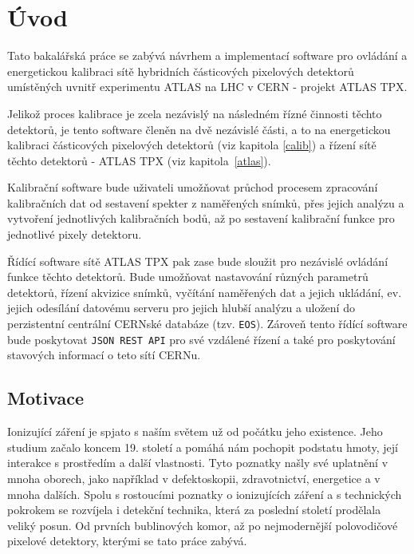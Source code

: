 

\chapter{Úvod}\label{chap01}
Tato bakalářská práce se zabývá návrhem a implementací software pro ovládání a energetickou kalibraci sítě hybridních částicových pixelových detektorů umístěných uvnitř experimentu ATLAS na LHC v CERN - projekt ATLAS TPX. 

Jelikož proces kalibrace je zcela nezávislý na následném řízné činnosti těchto detektorů, je tento software členěn na dvě nezávislé části, a to na energetickou kalibraci částicových pixelových detektorů (viz kapitola \ref{calib}) a řízení sítě těchto detektorů - ATLAS TPX (viz kapitola~\ref{atlas}).

Kalibrační software bude uživateli umožňovat průchod procesem zpracování kalibračních dat od sestavení spekter z naměřených snímků, přes jejich analýzu a vytvoření jednotlivých kalibračních bodů, až po sestavení kalibrační funkce pro jednotlivé pixely detektoru.

Řídící software sítě ATLAS TPX pak zase bude sloužit pro nezávislé ovládání funkce těchto detektorů. Bude umožňovat nastavování různých parametrů detektorů, řízení akvizice snímků, vyčítání naměřených dat a jejich ukládání, ev. jejich odesílání datovému serveru pro jejich hlubší analýzu a uložení do perzistentní centrální CERNské databáze (tzv. \texttt{EOS}). Zároveň tento řídící software bude poskytovat \texttt{JSON REST API} pro své vzdálené řízení a také pro poskytování stavových informací o teto sítí CERNu.

\section{Motivace}
Ionizující záření je spjato s naším světem už od počátku jeho existence. Jeho studium začalo koncem 19. století a pomáhá nám pochopit podstatu hmoty, její interakce s prostředím a další vlastnosti. Tyto poznatky našly své uplatnění v mnoha oborech, jako například v defektoskopii, zdravotnictví, energetice a v mnoha dalších. Spolu s rostoucími poznatky o ionizujících záření a s technických pokrokem se rozvíjela i detekční technika, která za poslední století prodělala veliký posun. Od prvních bublinových komor, až po nejmodernější polovodičové pixelové detektory, kterými se tato práce zabývá. 



